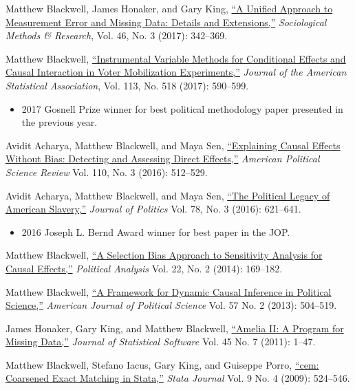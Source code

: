 \documentclass[11pt,article,oneside]{memoir}
\begin{document}
\begin{cvlist}
\item Matthew Blackwell, James Honaker, and Gary King, \href{http://gking.harvard.edu/files/measured.pdf}{``A Unified Approach to Measurement Error and
    Missing Data: Details and Extensions,''} \emph{Sociological Methods \& Research}, Vol. 46, No. 3 (2017): 342--369.
  
\item Matthew Blackwell, \href{http://www.mattblackwell.org/files/papers/joint-iv.pdf}{``Instrumental Variable Methods for Conditional Effects and Causal Interaction in Voter Mobilization Experiments,''} \emph{Journal of the American Statistical Association}, Vol. 113, No. 518 (2017): 590--599. 
\begin{itemize}[topsep=0em]
\item  2017 Gosnell Prize winner for best political methodology paper presented in the previous year. %
\end{itemize}

\item Avidit Acharya, Matthew Blackwell, and Maya Sen, \href{http://www.mattblackwell.org/files/papers/direct-effects.pdf}{``Explaining Causal Effects Without Bias: Detecting and Assessing Direct Effects,''} \emph{American Political Science Review } Vol. 110, No. 3 (2016): 512--529.

  
\item Avidit Acharya, Matthew Blackwell, and Maya Sen, \href{http://www.mattblackwell.org/files/papers/slavery.pdf}{``The Political Legacy of American Slavery,''}   \emph{Journal of Politics }Vol. 78, No. 3 (2016): 621--641.
\begin{itemize}[topsep=0em]
\item 2016 Joseph L. Bernd Award winner for best paper in the JOP.
\end{itemize}

\item Matthew Blackwell, \href{https://mattblackwell.org/files/papers/causalsens.pdf}{``A Selection Bias Approach to Sensitivity
    Analysis for Causal Effects,''} \emph{Political Analysis} Vol. 22, No. 2 (2014): 169--182.
  
\item Matthew Blackwell,
\href{http://mattblackwell.org/files/papers/dynci.pdf}{``A Framework
  for Dynamic Causal Inference in Political Science,''}
\emph{American Journal of Political Science} Vol. 57 No. 2 (2013): 504--519.

\item James Honaker, Gary King, and Matthew Blackwell, \href{http://www.mattblackwell.org/files/papers/amelia-jss.pdf}{``Amelia II: A
Program for Missing Data,''} \emph{Journal of Statistical Software}
Vol. 45 No. 7 (2011): 1--47.

\item Matthew Blackwell, Stefano Iacus, Gary King, and Guiseppe Porro, \href{http://www.mattblackwell.org/files/papers/cemStata.pdf}{``cem: Coarsened Exact Matching in Stata,''} \emph{Stata
  Journal} Vol. 9 No. 4 (2009): 524--546. 

\end{cvlist}
\end{document}
